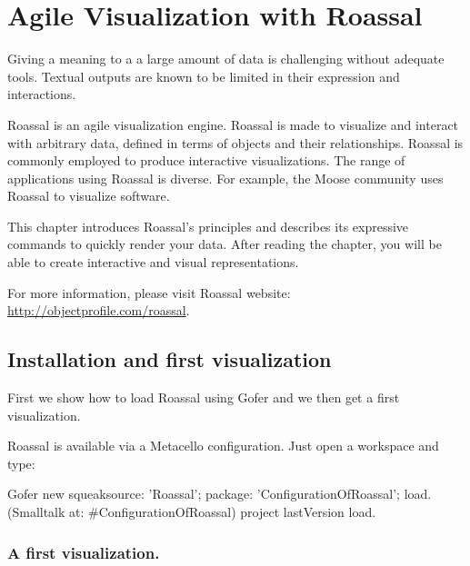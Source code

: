 \documentclass[a4paper,10pt,twoside]{book}
\begin{document}
\fi
\sloppy
\chapter{Agile Visualization with Roassal}


Giving a meaning to a a large amount of data is challenging without adequate tools. Textual outputs are known to be limited in their expression and interactions. 

Roassal is an agile visualization engine. Roassal is made to visualize and interact with arbitrary data, defined in terms of objects and their relationships. Roassal is commonly employed to produce interactive visualizations. The range of applications using Roassal is diverse. For example, the Moose community uses Roassal to visualize software.

This chapter introduces Roassal's principles and describes its expressive commands to quickly render your data. After reading the chapter, you will be able to create interactive and visual representations.

For more information, please visit Roassal website: \url{http://objectprofile.com/roassal}.

\section{Installation and first visualization}
First we show how to load Roassal using Gofer and we then get a first visualization.

Roassal is available via a Metacello configuration. Just open a workspace and type:

\begin{code}{}
Gofer new
	squeaksource: 'Roassal'; 
	package: 'ConfigurationOfRoassal';
	load.
(Smalltalk at: #ConfigurationOfRoassal) project lastVersion load.
\end{code}


\subsection{A first visualization.}


\end{document}
